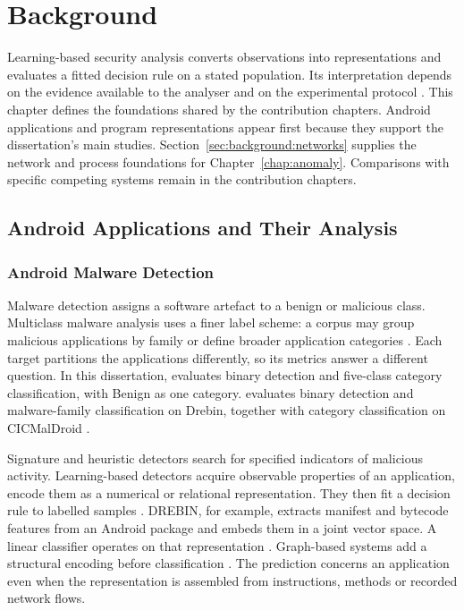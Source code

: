 \chapter{Background}
\label{chap:background}

Learning-based security analysis converts observations into representations and evaluates a
fitted decision rule on a stated population. Its interpretation depends on the evidence
available to the analyser and on the experimental protocol \cite{arp2022dos}. This chapter
defines the foundations shared by the contribution chapters. Android applications and program
representations appear first because they support the dissertation's main studies.
Section~\ref{sec:background:networks} supplies the network and process foundations for
Chapter~\ref{chap:anomaly}. Comparisons with specific competing systems remain in the
contribution chapters.

\section{Android Applications and Their Analysis}
\label{sec:background:android}

\subsection{Android Malware Detection}
\label{sec:background:android:detection}

Malware detection assigns a software artefact to a benign or malicious class. Multiclass
malware analysis uses a finer label scheme: a corpus may group malicious applications by
family or define broader application categories \cite{bilot2024survey}. Each target partitions
the applications differently, so its metrics answer a different question. In this dissertation,
\hybroid{} evaluates binary detection and
five-class category classification, with Benign as one category. \hgann{} evaluates binary
detection and malware-family classification on Drebin, together with category classification
on CICMalDroid \cite{norouzian2021hybroid,norouzian2025hgannmal}.

Signature and heuristic detectors search for specified indicators of malicious activity.
Learning-based detectors acquire observable properties of an application, encode them as a
numerical or relational representation. They then fit a decision rule to labelled samples
\cite{arp2014drebin,liu2023deeplearning}. DREBIN, for example, extracts manifest and bytecode
features from an Android package and embeds them in a joint vector space. A linear classifier
operates on that representation \cite{arp2014drebin}. Graph-based systems add a structural
encoding before classification \cite{bilot2024survey}. The prediction concerns an application
even when the representation is assembled from instructions, methods or recorded network
flows.

